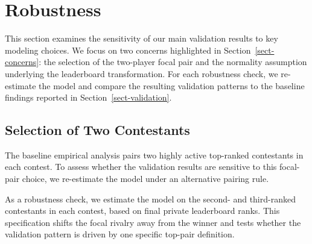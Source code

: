 \documentclass[mnsc]{informs3}
\begin{document}
\section{Robustness}

This section examines the sensitivity of our main validation results to key modeling choices.
We focus on two concerns highlighted in Section~\ref{sect-concerns}: the selection of the two-player focal pair and the normality assumption underlying the leaderboard transformation. For each robustness check, we re-estimate the model and compare the resulting validation patterns to the baseline findings reported in Section~\ref{sect-validation}.

\subsection{Selection of Two Contestants}\label{sect-robust-2players}

The baseline empirical analysis pairs two highly active top-ranked contestants in each contest.
To assess whether the validation results are sensitive to this focal-pair choice, we re-estimate the model under an alternative pairing rule.

As a robustness check, we estimate the model on the second- and third-ranked contestants in each contest, based on final private leaderboard ranks.
This specification shifts the focal rivalry away from the winner and tests whether the validation pattern is driven by one specific top-pair definition.
\end{document}
